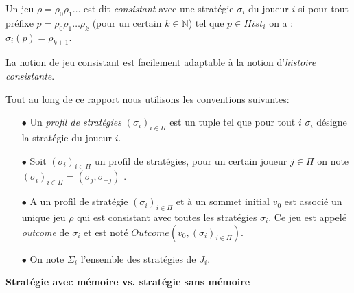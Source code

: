 \begin{defi}	
	Un jeu $\rho = \rho _{0}  \rho _{1} \ldots$ est dit \textit{consistant} avec une stratégie $\sigma _{i}$ du joueur $i$ si pour tout préfixe $p = \rho _{0}\rho _{1}\ldots \rho _{k}$ (pour un certain $k \in \mathbb{N}$) tel que $p \in Hist_{i}$ on a : $\sigma _{i}(p) = \rho_{k+1}$.	
\end{defi}

\begin{rem}
	La notion de jeu consistant est facilement adaptable à la notion d'\textit{histoire consistante}.
\end{rem}

\begin{notations}
	Tout au long de ce rapport nous utilisons les conventions suivantes:
	\begin{enumerate}
		\item[$\bullet$] Un \textit{profil de stratégies} $(\sigma _{i})_{i \in \Pi}$ est un tuple tel que pour tout $i$ $\sigma _{i}$ désigne la stratégie du 	joueur $i$. 
				
		\item[$\bullet$] Soit  $(\sigma _{i})_{i \in \Pi}$ un profil de stratégies, pour un certain joueur $j\in \Pi $ on note $(\sigma _{i})_{i \in \Pi} = ( \sigma _{j},\sigma _{-j})$ .
		
		\item[$\bullet$] A un profil de stratégie $(\sigma _{i})_{i \in \Pi}$ et à un sommet initial $v_{0}$ est associé un unique jeu $\rho$ qui est consistant avec toutes les stratégies $\sigma _{i}$. Ce jeu est appelé \textit{outcome} de $\sigma _{i}$ et est noté $Outcome(v_{0},(\sigma _{i})_{i\in \Pi})$.
		
		\item[$\bullet$] On note $\Sigma _{i}$ l'ensemble des stratégies de $J_{i}$.
		
	\end{enumerate}
\end{notations}
		



\noindent\textbf{Stratégie avec mémoire vs. stratégie sans mémoire}\\
\todo{}

